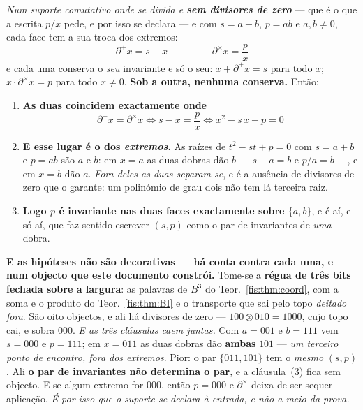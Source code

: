 \documentclass[livro.tex]{subfiles}
\begin{document}
\begin{lema}\label{fis:lem:duasdobras}
\emph{Num suporte comutativo onde se divida e \textbf{sem divisores de zero}}
--- que é o que a escrita $p/x$ pede, e por isso se declara --- e com
$s=a+b$, $p=ab$ e $a,b\neq0$, cada face tem a sua troca dos extremos:
\[
\boxed{\;\partial^{+}x=s-x\;}\qquad\qquad\boxed{\;\partial^{\times}x=\frac{p}{x}\;}
\]
e cada uma conserva o \emph{seu} invariante e só o seu:
$x+\partial^{+}x=s$ para todo $x$; $x\cdot\partial^{\times}x=p$ para todo
$x\neq0$. \textbf{Sob a outra, nenhuma conserva.} Então:
\begin{enumerate}\itemsep3pt
\item[(1)] \textbf{As duas coincidem exactamente onde}
\[
\boxed{\;\partial^{+}x=\partial^{\times}x\iff s-x=\frac{p}{x}\iff x^{2}-s\,x+p=0\;}
\]
\item[(2)] \textbf{E esse lugar é o dos \emph{extremos}.} As raízes de
$t^{2}-st+p=0$ com $s=a+b$ e $p=ab$ são $a$ e $b$: em $x=a$ as duas dobras dão
$b$ --- $s-a=b$ e $p/a=b$ ---, e em $x=b$ dão $a$. \emph{Fora deles as duas
separam-se}, e é a ausência de divisores de zero que o garante: um polinómio de
grau dois não tem lá terceira raiz.
\item[(3)] \textbf{Logo $p$ é invariante nas duas faces exactamente sobre
$\{a,b\}$}, e é aí, e só aí, que faz sentido escrever $(s,p)$ como o par de
invariantes de \emph{uma} dobra.
\end{enumerate}
\end{lema}

\medskip\noindent\textbf{E as hipóteses não são decorativas --- há conta contra
cada uma, e num objecto que este documento constrói.} Tome-se a \textbf{régua de
três bits fechada sobre a largura}: as palavras de $B^{3}$ do
Teor.~\ref{fis:thm:coord}, com a soma e o produto do Teor.~\ref{fis:thm:BI} e o
transporte que sai pelo topo \emph{deitado fora}. São oito objectos, e ali há
divisores de zero --- $100\otimes010=1000$, cujo topo cai, e sobra $000$.
\smallskip
\emph{E as três cláusulas caem juntas.} Com $a=001$ e $b=111$ vem $s=000$ e
$p=111$; em $x=011$ as duas dobras dão \textbf{ambas} $101$ --- \emph{um terceiro
ponto de encontro, fora dos extremos}. Pior: o par $\{011,101\}$ tem o
\emph{mesmo} $(s,p)$. Ali \textbf{o par de invariantes não determina o par}, e a
cláusula~(3) fica sem objecto. E se algum extremo for $000$, então $p=000$ e
$\partial^{\times}$ deixa de ser sequer aplicação. \emph{É por isso que o suporte
se declara à entrada, e não a meio da prova.}
\end{document}
